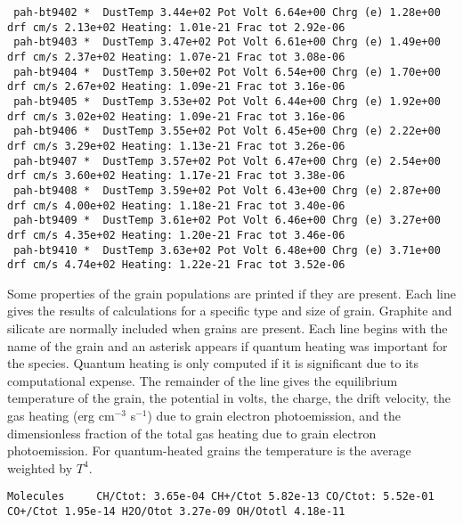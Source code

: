 {\begin{verbatim}
 pah-bt9402 *  DustTemp 3.44e+02 Pot Volt 6.64e+00 Chrg (e) 1.28e+00 drf cm/s 2.13e+02 Heating: 1.01e-21 Frac tot 2.92e-06
 pah-bt9403 *  DustTemp 3.47e+02 Pot Volt 6.61e+00 Chrg (e) 1.49e+00 drf cm/s 2.37e+02 Heating: 1.07e-21 Frac tot 3.08e-06
 pah-bt9404 *  DustTemp 3.50e+02 Pot Volt 6.54e+00 Chrg (e) 1.70e+00 drf cm/s 2.67e+02 Heating: 1.09e-21 Frac tot 3.16e-06
 pah-bt9405 *  DustTemp 3.53e+02 Pot Volt 6.44e+00 Chrg (e) 1.92e+00 drf cm/s 3.02e+02 Heating: 1.09e-21 Frac tot 3.16e-06
 pah-bt9406 *  DustTemp 3.55e+02 Pot Volt 6.45e+00 Chrg (e) 2.22e+00 drf cm/s 3.29e+02 Heating: 1.13e-21 Frac tot 3.26e-06
 pah-bt9407 *  DustTemp 3.57e+02 Pot Volt 6.47e+00 Chrg (e) 2.54e+00 drf cm/s 3.60e+02 Heating: 1.17e-21 Frac tot 3.38e-06
 pah-bt9408 *  DustTemp 3.59e+02 Pot Volt 6.43e+00 Chrg (e) 2.87e+00 drf cm/s 4.00e+02 Heating: 1.18e-21 Frac tot 3.40e-06
 pah-bt9409 *  DustTemp 3.61e+02 Pot Volt 6.46e+00 Chrg (e) 3.27e+00 drf cm/s 4.35e+02 Heating: 1.20e-21 Frac tot 3.46e-06
 pah-bt9410 *  DustTemp 3.63e+02 Pot Volt 6.48e+00 Chrg (e) 3.71e+00 drf cm/s 4.74e+02 Heating: 1.22e-21 Frac tot 3.52e-06
\end{verbatim}
}

Some properties of the grain populations are printed if they are present.
Each line gives the results of calculations for a specific type and size
of grain.
Graphite and silicate are normally included when grains are
present.
Each line begins with the name of the grain and an asterisk appears
if quantum heating was important for the species.
Quantum heating is only
computed if it is significant due to its computational expense.
The
remainder of the line gives the equilibrium temperature of the grain, the
potential in volts, the charge, the drift velocity, the gas heating (erg
cm$^{-3}$ s$^{-1}$) due to grain electron photoemission, and the dimensionless fraction
of the total gas heating due to grain electron photoemission.
For
quantum-heated grains the temperature is the average weighted by $T^4$.

{\setverbatimfontsize{\tiny}
\begin{verbatim}
Molecules     CH/Ctot: 3.65e-04 CH+/Ctot 5.82e-13 CO/Ctot: 5.52e-01 CO+/Ctot 1.95e-14 H2O/Otot 3.27e-09 OH/Ototl 4.18e-11
\end{verbatim}
}

